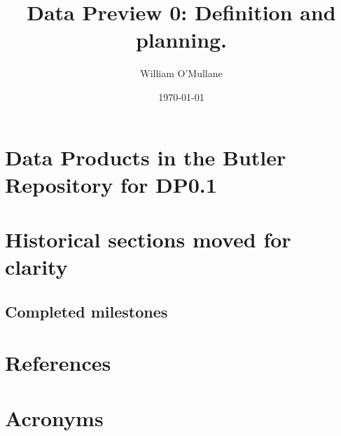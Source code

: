 \documentclass[OPS,authoryear]{lsstdoc}
\title{Data Preview 0: Definition and planning.}
\author{%
William O'Mullane
}
\date{\today}
\begin{document}

\mkshorttitle





\appendix

\section{Data Products in the Butler Repository for DP0.1} \label{sec:dp01butler}

\section{Historical sections moved for clarity}

\subsection{Completed milestones}



\section{References} \label{sec:bib}
\renewcommand{\refname}{}


\section{Acronyms} \label{sec:acronyms}


%
\end{document}
